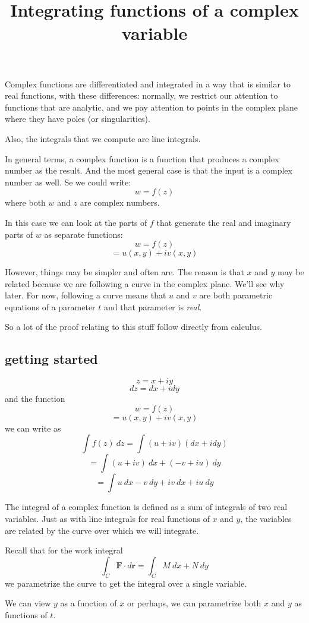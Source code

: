 \documentclass[11pt, oneside]{article}   	%
\title{Integrating functions of a complex variable}
\date{}							%
\begin{document}
\maketitle
\Large
Complex functions are differentiated and integrated in a way that is similar to real functions, with these differences:  normally, we restrict our attention to functions that are analytic, and we pay attention to points in the complex plane where they have poles (or singularities).  

Also, the integrals that we compute are line integrals.

In general terms, a complex function is a function that produces a complex number as the result.  And the most general case is that the input is a complex number as well.  Se we could write:
\[ w = f(z) \]
where both $w$ and $z$ are complex numbers.

In this case we can look at the parts of $f$ that generate the real and imaginary parts of $w$ as separate functions:
\[ w = f(z) \]
\[ = u(x,y) + iv(x,y) \]

However, things may be simpler and often are.  The reason is that $x$ and $y$ may be related because we are following a curve in the complex plane.  We'll see why later.  For now, following a curve means that $u$ and $v$ are both parametric equations of a parameter $t$ and that parameter is \emph{real}.

So a lot of the proof relating to this stuff follow directly from calculus.

\subsection*{getting started}

\[ z = x + i y \]
\[ dz = dx + i dy \]
and the function
\[ w = f(z) \]
\[ = u(x,y) + iv(x,y) \]
we can write as
 \[ \int f(z) \ dz = \int (u + i v) (dx + i dy) \]
\[ = \int (u + iv) \ dx + (- v + i u) \ dy \]
\[ = \int u \ dx - v \ dy + iv \ dx + iu \ dy \]

The integral of a complex function is defined as a sum of integrals of two real variables.  Just as with line integrals for real functions of $x$ and $y$, the variables are related by the curve over which we will integrate.

Recall that for the work integral
\[ \int_C \mathbf{F} \cdot d \mathbf{r} = \int_C M \ dx + N \ dy \]
we parametrize the curve to get the integral over a single variable.

We can view $y$ as a function of $x$ or perhaps, we can parametrize both $x$ and $y$ as functions of $t$.
\end{document}
